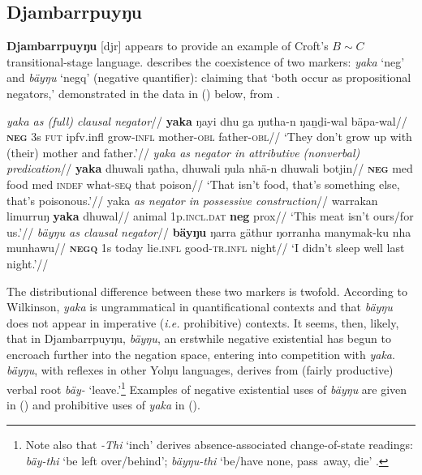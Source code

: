 \documentclass[usenames,dvipsnames,11pt]{article}
\begin{document}
{{\subsection{Djambarrpuyŋu} \textbf{Djambarrpuyŋu} [\gls{djr}] appears to provide an example of Croft's $B\sim C$ transitional-stage language. \citet[356]{Wilkinson1991} describes the coexistence of two markers: \textit{yaka} `\gls{neg}' and \textit{bäyŋu} `\gls{negq}' (negative quantifier): claiming that `both occur as propositional negators,' demonstrated in the data in (\nextx) below, from \citet{Wilkinson1991}.

\pex
\a\begingl\glpreamble \textit{{\em yaka} as (full) clausal negator}//
\gla \textbf{yaka} ŋayi dhu ga ŋutha-n ŋaṉḏi-wal bäpa-wal//
\glb \textsc{\textbf{neg}} 3s \textsc{fut} \gls{ipfv}.\gls{infl} grow-\textsc{infl} mother\textsc{-obl} father\textsc{-obl}//
\glft `They don't grow up with (their) mother and father.'//
\endgl
\a\begingl\glpreamble \textit{{\em yaka} as negator in attributive (nonverbal) predication}//
\gla \textbf{yaka} dhuwali ŋatha, dhuwali ŋula nhä-n dhuwali botjin//
\glb \textsc{\textbf{neg}} \gls{med} food \gls{med} \textsc{indef} what-\textsc{seq} that poison//
\glft`That isn't food, that's something else, that's poisonous.'//\endgl
\a\begingl\glpreamble yaka \textit{as negator in possessive construction}//
\gla warrakan limurruŋ \textbf{yaka} dhuwal//
\glb animal 1p.\textsc{incl.dat} \textbf{\gls{neg}} \gls{prox}//
\glft`This meat isn't ours/for us.'//
\endgl
\a\begingl
\glpreamble\textit{ {\em bäyŋu} as clausal negator}//
\gla \textbf{bäyŋu} ŋarra gäthur ŋorranha manymak-ku	nha munhawu//
\glb \textsc{\textbf{negq}} 1s today lie\textsc{.infl} good-\textsc{tr.infl} night//
\glft `I didn't sleep well last night.'\hfill\citep[357]{Wilkinson1991}//
\endgl\xe

The distributional difference between these two markers is twofold. According to Wilkinson, \textit{yaka} is ungrammatical in quantificational contexts and that \textit{bäyŋu} does not appear in imperative (\textit{i.e.} prohibitive) contexts. It seems, then, likely, that in Djambarrpuyŋu, \textit{bäyŋu}, an erstwhile negative existential has begun to encroach further into the negation space, entering into competition with \textit{yaka}. \textit{bäyŋu}, with reflexes in other Yolŋu languages, derives from (fairly productive) verbal root \textit{bäy-} `leave.'\footnote{Note also that \textit{-Thi} `\gls{inch}' derives absence-associated change-of-state readings: \textit{bäy-thi} `be left over/behind'; \textit{bäyŋu-thi} `be/have none, pass~away, die' \citep[378]{Wilkinson1991}.} Examples of negative existential uses of \textit{bäyŋu} are given in (\nextx) and prohibitive uses of \textit{yaka} in (\anextx).


}}
\end{document}
